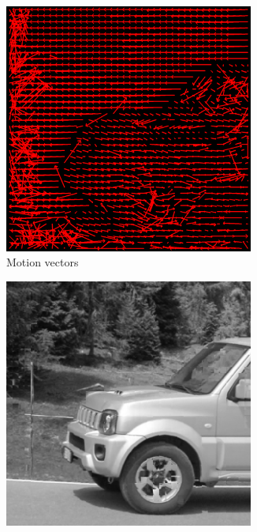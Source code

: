 \documentclass{homework}
\begin{document}
\begin{figure}[H]
    \centering
    \begin{subfigure}{0.32\textwidth}
        \centering
        \includegraphics[width=0.9\textwidth]{8_32_motion_vectors.png}
        \caption{Motion vectors}
    \end{subfigure}
    \begin{subfigure}{0.32\textwidth}
        \centering
        \includegraphics[width=0.9\textwidth]{8_32_motion_compensation.png}

\end{subfigure}
\end{figure}
\end{document}

